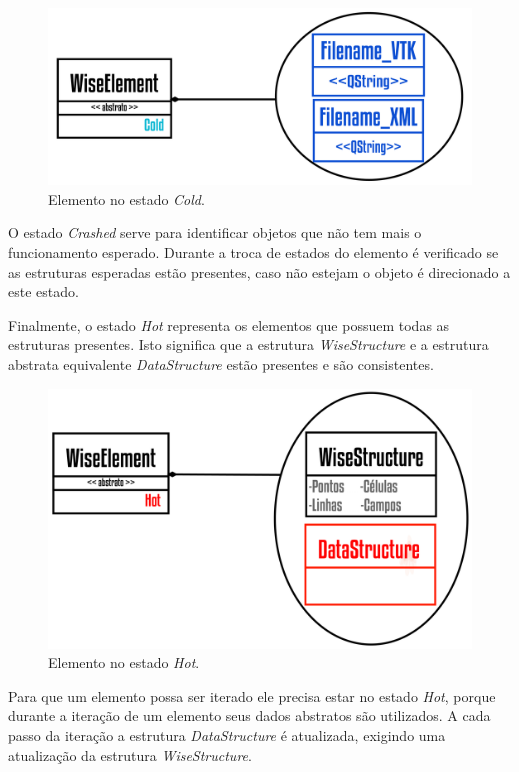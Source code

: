 \begin{figure}[!htbp]
	\centering
	\includegraphics[scale=1.85]{Figures/WiseElementCold@16x.png}
	\caption{Elemento no estado \textit{Cold}.}
	\label{fig5:wiselementcold}
\end{figure}

O estado \textit{Crashed} serve para identificar objetos que não tem mais o funcionamento esperado. Durante a troca de estados do elemento é verificado se as estruturas esperadas estão presentes, caso não estejam o objeto é direcionado a este estado.

Finalmente, o estado \textit{Hot} representa os elementos que possuem todas as estruturas presentes. Isto significa que a estrutura \textit{WiseStructure} e a estrutura abstrata equivalente \textit{DataStructure} estão presentes e são consistentes.

\begin{figure}[!htbp]
	\centering
	\includegraphics[scale=1.85]{Figures/WiseElementHot@16x.png}
	\caption{Elemento no estado \textit{Hot}.}
	\label{fig6:wiseelementhot}
\end{figure}

Para que um elemento possa ser iterado ele precisa estar no estado \textit{Hot}, porque durante a iteração de um elemento seus dados abstratos são utilizados. A cada passo da iteração a estrutura \textit{DataStructure} é atualizada, exigindo uma atualização da estrutura \textit{WiseStructure}.

